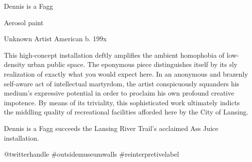 \documentclass[varwidth=5in, border={20pt 20pt 20pt 20pt}]{standalone}
\begin{document}
\raggedright

{\huge\mybolditalicfont Dennis is a Fagg}

\hspace{0.5cm} {\Large {}}

\hspace{0.5cm} Aerosol paint

\smallskip

{\Large\myboldfont Unknown Artist} \hspace{0.5cm} { \small American b. 199x }

\medskip

This high-concept installation deftly amplifies the ambient homophobia of low-density urban public space.
The eponymous piece distinguishes itself by its sly realization of exactly what you would expect here.
In an anonymous and brazenly self-aware act of intellectual martyrdom, the artist conspicuously squanders his medium's expressive potential in order to proclaim his own profound creative impotence.
By means of its triviality, this sophisticated work ultimately indicts the middling quality of recreational facilities afforded here by the City of Lansing.

\medskip

{\myitalicfont Dennis is a Fagg} succeeds the Lansing River Trail's acclaimed {\myitalicfont Ass Juice} installation.

\bigskip

{\myboldfont @twitterhandle} \hfill {\myitalicfont \#outsidemuseumwalls \#reinterpretivelabel}
\end{document}
